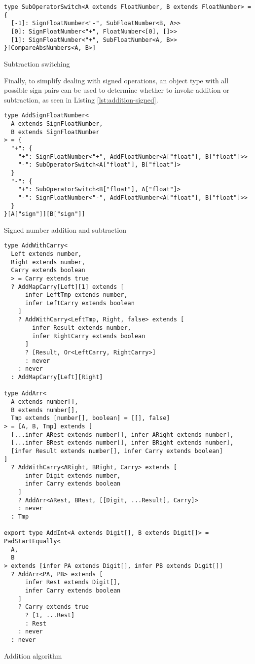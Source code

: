 \begin{listing}[ht!]
  \begin{verbatim}
type SubOperatorSwitch<A extends FloatNumber, B extends FloatNumber> = {
  [-1]: SignFloatNumber<"-", SubFloatNumber<B, A>>
  [0]: SignFloatNumber<"+", FloatNumber<[0], []>>
  [1]: SignFloatNumber<"+", SubFloatNumber<A, B>>
}[CompareAbsNumbers<A, B>]
\end{verbatim}
  \caption{Subtraction switching}\label{lst:subtractor-switching}
\end{listing}

Finally, to simplify dealing with signed operations, an object type with all possible sign pairs can be used to determine whether to invoke addition or subtraction, as seen in Listing \ref{lst:addition-signed}.

\begin{listing}[ht]
  \begin{verbatim}
type AddSignFloatNumber<
  A extends SignFloatNumber,
  B extends SignFloatNumber
> = {
  "+": {
    "+": SignFloatNumber<"+", AddFloatNumber<A["float"], B["float"]>>
    "-": SubOperatorSwitch<A["float"], B["float"]>
  }
  "-": {
    "+": SubOperatorSwitch<B["float"], A["float"]>
    "-": SignFloatNumber<"-", AddFloatNumber<A["float"], B["float"]>>
  }
}[A["sign"]][B["sign"]]
\end{verbatim}
  \caption{Signed number addition and subtraction}\label{lst:addition-signed}
\end{listing}

\begin{listing}[ht!]
  \begin{verbatim}
type AddWithCarry<
  Left extends number,
  Right extends number,
  Carry extends boolean
  > = Carry extends true
  ? AddMapCarry[Left][1] extends [
      infer LeftTmp extends number,
      infer LeftCarry extends boolean
    ]
    ? AddWithCarry<LeftTmp, Right, false> extends [
        infer Result extends number,
        infer RightCarry extends boolean
      ]
      ? [Result, Or<LeftCarry, RightCarry>]
      : never
    : never
  : AddMapCarry[Left][Right]

type AddArr<
  A extends number[],
  B extends number[],
  Tmp extends [number[], boolean] = [[], false]
> = [A, B, Tmp] extends [
  [...infer ARest extends number[], infer ARight extends number],
  [...infer BRest extends number[], infer BRight extends number],
  [infer Result extends number[], infer Carry extends boolean]
]
  ? AddWithCarry<ARight, BRight, Carry> extends [
      infer Digit extends number,
      infer Carry extends boolean
    ]
    ? AddArr<ARest, BRest, [[Digit, ...Result], Carry]>
    : never
  : Tmp

export type AddInt<A extends Digit[], B extends Digit[]> = PadStartEqually<
  A,
  B
> extends [infer PA extends Digit[], infer PB extends Digit[]]
  ? AddArr<PA, PB> extends [
      infer Rest extends Digit[],
      infer Carry extends boolean
    ]
    ? Carry extends true
      ? [1, ...Rest]
      : Rest
    : never
  : never
\end{verbatim}
  \caption{Addition algorithm}\label{lst:addition-algorithm}
\end{listing}
